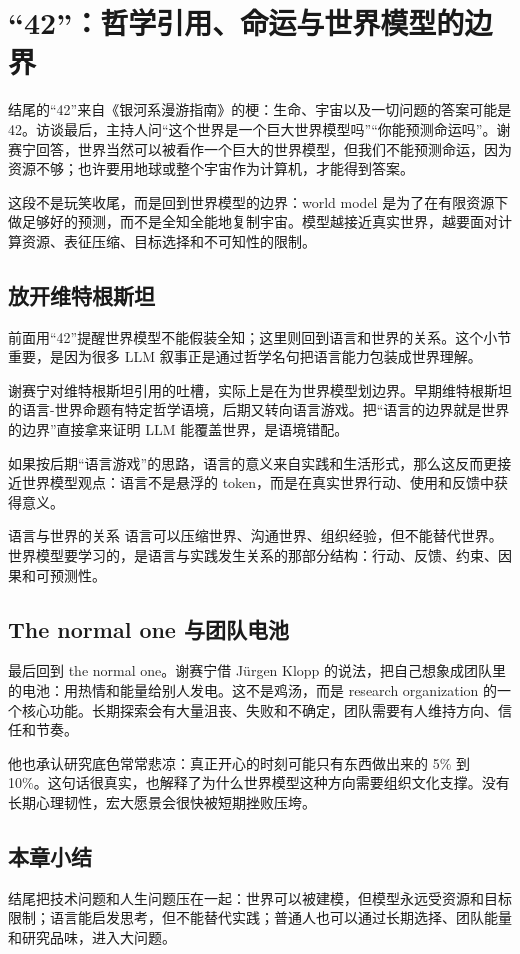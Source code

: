 \section{“42”：哲学引用、命运与世界模型的边界}

结尾的“42”来自《银河系漫游指南》的梗：生命、宇宙以及一切问题的答案可能是 42。访谈最后，主持人问“这个世界是一个巨大世界模型吗”“你能预测命运吗”。谢赛宁回答，世界当然可以被看作一个巨大的世界模型，但我们不能预测命运，因为资源不够；也许要用地球或整个宇宙作为计算机，才能得到答案。

这段不是玩笑收尾，而是回到世界模型的边界：world model 是为了在有限资源下做足够好的预测，而不是全知全能地复制宇宙。模型越接近真实世界，越要面对计算资源、表征压缩、目标选择和不可知性的限制。

\subsection{放开维特根斯坦}

前面用“42”提醒世界模型不能假装全知；这里则回到语言和世界的关系。这个小节重要，是因为很多 LLM 叙事正是通过哲学名句把语言能力包装成世界理解。

谢赛宁对维特根斯坦引用的吐槽，实际上是在为世界模型划边界。早期维特根斯坦的语言-世界命题有特定哲学语境，后期又转向语言游戏。把“语言的边界就是世界的边界”直接拿来证明 LLM 能覆盖世界，是语境错配。

如果按后期“语言游戏”的思路，语言的意义来自实践和生活形式，那么这反而更接近世界模型观点：语言不是悬浮的 token，而是在真实世界行动、使用和反馈中获得意义。

\begin{importantbox}{语言与世界的关系}
语言可以压缩世界、沟通世界、组织经验，但不能替代世界。世界模型要学习的，是语言与实践发生关系的那部分结构：行动、反馈、约束、因果和可预测性。
\end{importantbox}

\subsection{The normal one 与团队电池}

最后回到 the normal one。谢赛宁借 Jürgen Klopp 的说法，把自己想象成团队里的电池：用热情和能量给别人发电。这不是鸡汤，而是 research organization 的一个核心功能。长期探索会有大量沮丧、失败和不确定，团队需要有人维持方向、信任和节奏。

他也承认研究底色常常悲凉：真正开心的时刻可能只有东西做出来的 5\% 到 10\%。这句话很真实，也解释了为什么世界模型这种方向需要组织文化支撑。没有长期心理韧性，宏大愿景会很快被短期挫败压垮。

\subsection{本章小结}

结尾把技术问题和人生问题压在一起：世界可以被建模，但模型永远受资源和目标限制；语言能启发思考，但不能替代实践；普通人也可以通过长期选择、团队能量和研究品味，进入大问题。

